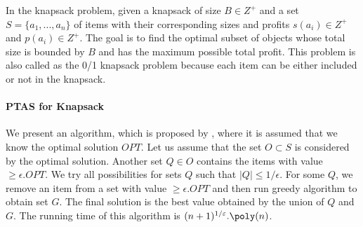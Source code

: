In the knapsack problem, given a knapsack of size $B \in Z^+$ and a set $S = \{a_1, . . . , a_n\}$
of items with their corresponding sizes and profits $s(a_i) \in Z^+$ and $p(a_i) \in Z^+$. The goal is to find
the optimal subset of objects whose total size is bounded by $B$ and has the maximum possible
total profit. This problem is also called as the 0/1 knapsack problem because each
item can be either included or not in the knapsack. 

\paragraph{PTAS for Knapsack}
We present an algorithm, which is proposed by \cite{lawler1979fast}, where it is assumed that we know the optimal solution $OPT$.
Let us assume that the set $O \subset S$ is considered by the optimal solution.
Another set $Q \in O$ contains the items with value $\ge \epsilon. OPT$.
We try all possibilities for sets $Q$ such that $|Q| \le 1/\epsilon$.
For some $Q$, we remove an item from a set with value $\ge \epsilon.OPT$ and then run greedy algorithm to obtain set $G$.
The final solution is the best value obtained by the union of $Q$ and $G$.
The running time of this algorithm is $(n+1)^{1/\epsilon} . \poly(n)$.

